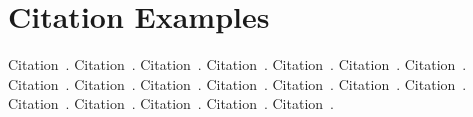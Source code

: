 \section{Citation Examples}
Citation~\parencite{rfc-9000}.
Citation~\parencite{iso-osi-standard}.
Citation~\parencite{draft-moqtransport}.
Citation~\parencite{article-quic-usage}.
Citation~\parencite{internet-quic-usage}.
Citation~\parencite{facebook-quic-usage}.
Citation~\parencite{google-quic-usage}.
Citation~\parencite{quic-nic-offload}.
Citation~\parencite{quic-explained}.
Citation~\parencite{equic-gateway}.
Citation~\parencite{media-streaming-prio-drop}.
Citation~\parencite{quic-nic-offload-patent}.
Citation~\parencite{kernel-bypass-msc-thesis}.
Citation~\parencite{quic-go-repo}.
Citation~\parencite{quic-go-prio-packs-repo}.
Citation~\parencite{adaptive-moq-repo}.
Citation~\parencite{priority-moqtransport-repo}.
Citation~\parencite{fast-relays-thesis-repo}.
Citation~\parencite{ebpf-verifier}.